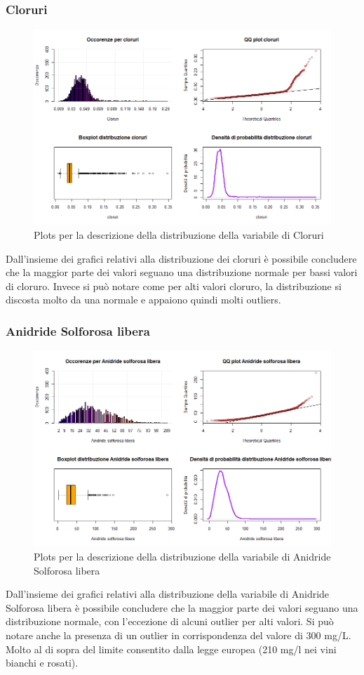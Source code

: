 \documentclass[12pt]{article}
\begin{document}
\subsubsection{Cloruri}
\begin{figure}[!htb]
    \centering
    \includegraphics[width=1\textwidth]{immagini/clor.png}
    \caption{Plots per la descrizione della distribuzione della variabile di Cloruri}
\end{figure}
\FloatBarrier
Dall'insieme dei grafici relativi alla distribuzione dei cloruri è possibile concludere che la maggior parte dei valori seguano una distribuzione normale per bassi valori di cloruro. Invece si può notare come per alti valori cloruro, la distribuzione si discosta molto da una normale e appaiono quindi molti outliers.
\newpage
\subsubsection{Anidride Solforosa libera}
\begin{figure}[!htb]
    \centering
    \includegraphics[width=1\textwidth]{immagini/anlib.png}
    \caption{Plots per la descrizione della distribuzione della variabile di Anidride Solforosa libera}
\end{figure}
\FloatBarrier
Dall'insieme dei grafici relativi alla distribuzione della variabile di Anidride Solforosa libera è possibile concludere che la maggior parte dei valori seguano una distribuzione normale, con l'eccezione di alcuni outlier per alti valori. Si può notare anche la presenza di un outlier in corrispondenza del valore di 300 mg/L. Molto al di sopra del limite consentito dalla legge europea (210 mg/l nei vini bianchi e rosati).
\newpage
\end{document}
